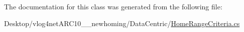The documentation for this class was generated from the following file\-:\begin{DoxyCompactItemize}
\item 
Desktop/vlog4net\-A\-R\-C10\-\_\-\_\-newhoming/\-Data\-Centric/\hyperlink{_home_range_criteria_8cs}{Home\-Range\-Criteria.\-cs}\end{DoxyCompactItemize}
